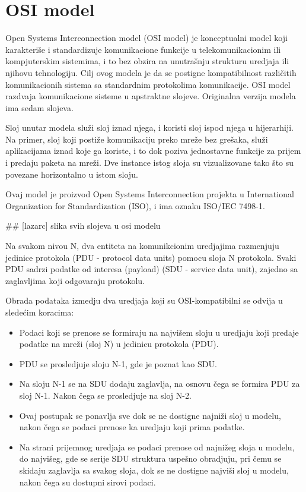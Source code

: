 \documentclass[a4paper,12pt, master]{etf}
\begin{document}
	\section{OSI model}

	Open Systems Interconnection model (OSI model) je konceptualni model koji karakteri\v{s}e i
	standardizuje komunikacione funkcije u telekomunikacionim ili kompjuterskim sistemima, i 
	to bez obzira na unutra\v{s}nju strukturu uredjaja ili njihovu tehnologiju. Cilj ovog modela 
	je da se postigne kompatibilnost razli\v{c}itih komunikacionih sistema sa standardnim 
	protokolima komunikacije. OSI model razdvaja komunikacione sisteme u apstraktne slojeve. 
	Originalna verzija modela ima sedam slojeva.

	Sloj unutar modela slu\v{z}i sloj iznad njega, i koristi sloj ispod njega u hijerarhiji. Na 
	primer, sloj koji posti\v{z}e komunikaciju preko mre\v{z}e bez gre\v{s}aka, slu\v{z}i aplikacijama iznad 
	koje ga koriste, i to dok poziva jednostavne funkcije za prijem i predaju paketa na mre\v{z}i. 
	Dve instance istog sloja su vizualizovane tako \v{s}to su povezane horizontalno u istom sloju.

	Ovaj model je proizvod Open Systems Interconnection projekta u International Organization 
	for Standardization (ISO), i ima oznaku ISO/IEC 7498-1.

	\#\# [lazarc] slika svih slojeva u osi modelu

	Na svakom nivou N, dva entiteta na komunikcionim uredjajima razmenjuju jedinice protokola 
	(PDU - protocol data units) pomocu sloja N protokola. Svaki PDU sadrzi podatke od interesa 
	(payload) (SDU - service data unit), zajedno sa zaglavljima koji odgovaraju protokolu.

	Obrada podataka izmedju dva uredjaja koji su OSI-kompatibilni se odvija u slede\'{c}im 
	koracima:
	\begin{itemize}
		\item Podaci koji se prenose se formiraju na najvi\v{s}em sloju u uredjaju koji predaje 
		podatke na mre\v{z}i (sloj N) u jedinicu protokola (PDU).
		\item PDU se prosledjuje sloju N-1, gde je poznat kao SDU.
		\item Na sloju N-1 se na SDU dodaju zaglavlja, na osnovu \v{c}ega se formira PDU za sloj 
		N-1. Nakon \v{c}ega se prosledjuje na sloj N-2.
		\item Ovaj postupak se ponavlja sve dok se ne dostigne najni\v{z}i sloj u modelu, nakon 
		\v{c}ega se podaci prenose ka uredjaju koji prima podatke.
		\item Na strani prijemnog uredjaja se podaci prenose od najni\v{z}eg sloja u modelu, do
		najvi\v{s}eg, gde se serije SDU struktura uspe\v{s}no obradjuju, pri \v{c}emu se skidaju zaglavlja 
		sa svakog sloja, dok se ne dostigne najvi\v{s}i sloj u modelu, nakon \v{c}ega su dostupni 
		sirovi podaci.
	\end{itemize}
\end{document}
